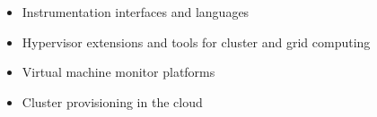 \documentclass[a4shrink,portrait,final]{baposter}
\begin{document}
\begin{poster}
{\begin{itemize}
\item Instrumentation interfaces and languages
\item Hypervisor extensions and tools for cluster and grid computing
\item Virtual machine monitor platforms
\item Cluster provisioning in the cloud
\end{itemize}
  }
\end{poster}
\end{document}
